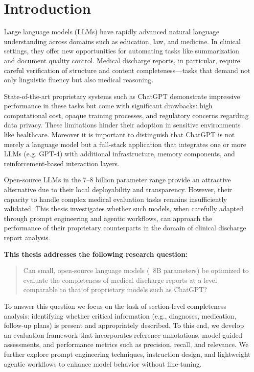 \section{Introduction}
Large language models (LLMs) have rapidly advanced natural language understanding across domains such as education, law, and medicine.\cite{p0} In clinical settings, they offer new opportunities for automating tasks like summarization and document quality control. Medical discharge reports, in particular, require careful verification of structure and content completeness—tasks that demand not only linguistic fluency but also medical reasoning.

State-of-the-art proprietary systems such as ChatGPT demonstrate impressive
performance in these tasks but come with significant drawbacks: high
computational cost, opaque training processes, and regulatory concerns
regarding data privacy. These limitations hinder their adoption in sensitive
environments like healthcare. Moreover it is important to distinguish that
ChatGPT is not merely a language model but a full-stack application that
integrates one or more LLMs (e.g. GPT-4) with additional infrastructure, memory
components, and reinforcement-based interaction layers.

Open-source LLMs in the 7–8 billion parameter range provide an attractive alternative due to their local deployability and transparency. However, their capacity to handle complex medical evaluation tasks remains insufficiently validated. This thesis investigates whether such models, when carefully adapted through prompt engineering and agentic workflows, can approach the performance of their proprietary counterparts in the domain of clinical discharge report analysis.

\vspace{2\baselineskip}

\textbf{This thesis addresses the following research question:}

\begin{quote}
Can small, open-source language models (~8B parameters) be optimized to evaluate the completeness of medical discharge reports at a level comparable to that of proprietary models such as ChatGPT?
\end{quote}

To answer this question we focus on the task of section-level completeness analysis: 
identifying whether critical information (e.g., diagnoses, medication, follow-up plans) 
is present and appropriately described. 
To this end, we develop an evaluation framework that incorporates reference annotations, 
model-guided assessments, and performance metrics such as precision, recall, and relevance.
We further explore prompt engineering techniques, instruction design, 
and lightweight agentic workflows to enhance model behavior without fine-tuning. 

\clearpage

